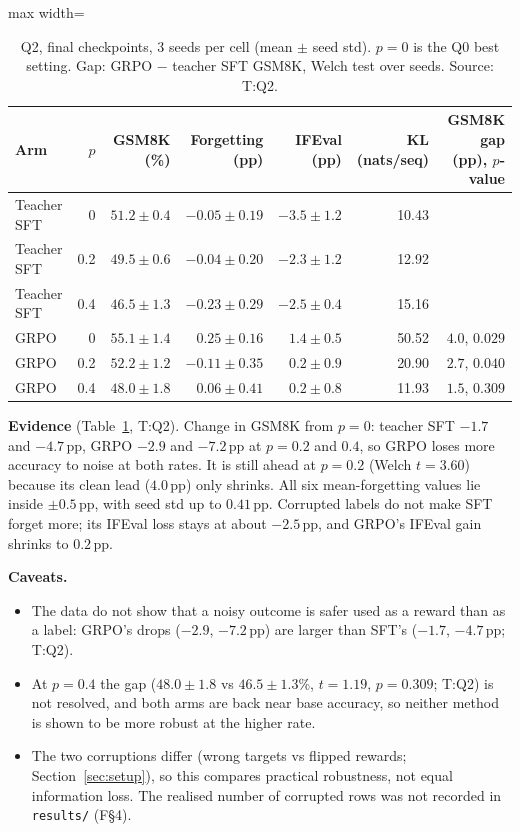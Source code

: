 \documentclass[11pt]{article}
\newcommand{\pp}{\,pp\xspace}
\newcommand{\T}[1]{\textsf{T:#1}}
\newcommand{\F}[1]{\textsf{F\S#1}}
\begin{document}
\begin{table}[!htb]
\centering\small
\caption{Q2, final checkpoints, 3 seeds per cell (mean $\pm$ seed std). $p = 0$ is the Q0 best setting. Gap:
GRPO $-$ teacher SFT GSM8K, Welch test over seeds. Source: \T{Q2}.}
\label{tab:q2}
\begin{adjustbox}{max width=\linewidth}
\begin{tabular}{lrrrrrr}
\toprule
Arm & $p$ & GSM8K (\%) & Forgetting (pp) & IFEval (pp) & KL (nats/seq) & GSM8K gap (pp), $p$-value\\
\midrule
Teacher SFT & 0 & $51.2 \pm 0.4$ & $-0.05 \pm 0.19$ & $-3.5 \pm 1.2$ & 10.43 & \\
Teacher SFT & 0.2 & $49.5 \pm 0.6$ & $-0.04 \pm 0.20$ & $-2.3 \pm 1.2$ & 12.92 & \\
Teacher SFT & 0.4 & $46.5 \pm 1.3$ & $-0.23 \pm 0.29$ & $-2.5 \pm 0.4$ & 15.16 & \\
GRPO & 0 & $55.1 \pm 1.4$ & $0.25 \pm 0.16$ & $1.4 \pm 0.5$ & 50.52 & $4.0$, $0.029$\\
GRPO & 0.2 & $52.2 \pm 1.2$ & $-0.11 \pm 0.35$ & $0.2 \pm 0.9$ & 20.90 & $2.7$, $0.040$\\
GRPO & 0.4 & $48.0 \pm 1.8$ & $0.06 \pm 0.41$ & $0.2 \pm 0.8$ & 11.93 & $1.5$, $0.309$\\
\bottomrule
\end{tabular}
\end{adjustbox}
\end{table}

\textbf{Evidence} (Table~\ref{tab:q2}, \T{Q2}). Change in GSM8K from $p = 0$: teacher SFT $-1.7$ and $-4.7$\pp, GRPO
$-2.9$ and $-7.2$\pp at $p = 0.2$ and $0.4$, so GRPO loses more accuracy to noise at both rates. It is still ahead at
$p = 0.2$ (Welch $t = 3.60$) because its clean lead ($4.0$\pp) only shrinks. All six mean-forgetting values lie inside
$\pm 0.5$\pp, with seed std up to $0.41$\pp. Corrupted labels do not make SFT forget more; its IFEval loss stays at
about $-2.5$\pp, and GRPO's IFEval gain shrinks to $0.2$\pp.

\textbf{Caveats.}
\begin{itemize}
\item The data do not show that a noisy outcome is safer used as a reward than as a label: GRPO's drops ($-2.9$,
  $-7.2$\pp) are larger than SFT's ($-1.7$, $-4.7$\pp; \T{Q2}).
\item At $p = 0.4$ the gap ($48.0 \pm 1.8$ vs $46.5 \pm 1.3$\%, $t = 1.19$, $p = 0.309$; \T{Q2}) is not resolved, and
  both arms are back near base accuracy, so neither method is shown to be more robust at the higher rate.
\item The two corruptions differ (wrong targets vs flipped rewards; Section~\ref{sec:setup}), so this compares
  practical robustness, not equal information loss. The realised number of corrupted rows was not recorded in
  \texttt{results/} (\F{4}).
\end{itemize}
\end{document}
